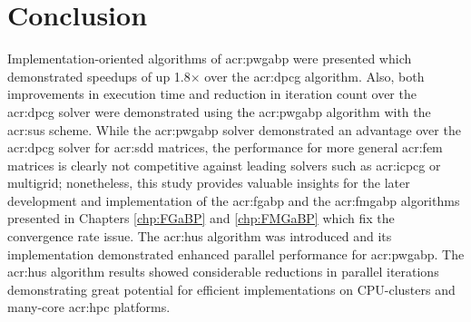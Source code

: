 \section{Conclusion}
Implementation-oriented algorithms of \gls{acr:pwgabp} were presented which demonstrated speedups of up 1.8$\times$ over the \gls{acr:dpcg} algorithm.
Also, both improvements in execution time and reduction in iteration count over the \gls{acr:dpcg} solver were demonstrated using the \gls{acr:pwgabp} algorithm with the \gls{acr:sus} scheme.
While the \gls{acr:pwgabp} solver demonstrated an advantage over the \gls{acr:dpcg} solver for \gls{acr:sdd} matrices, the performance for more general \gls{acr:fem} matrices is clearly not competitive against leading solvers such as \gls{acr:icpcg} or multigrid; nonetheless, this study provides valuable insights for the later development and implementation of the \gls{acr:fgabp} and the \gls{acr:fmgabp} algorithms presented in Chapters \ref{chp:FGaBP} and \ref{chp:FMGaBP} which fix the convergence rate issue.
The \gls{acr:hus} algorithm was introduced and its implementation demonstrated enhanced parallel performance for \gls{acr:pwgabp}.
The \gls{acr:hus} algorithm results showed considerable reductions in parallel iterations demonstrating great potential for efficient implementations on CPU-clusters and many-core \gls{acr:hpc} platforms.
